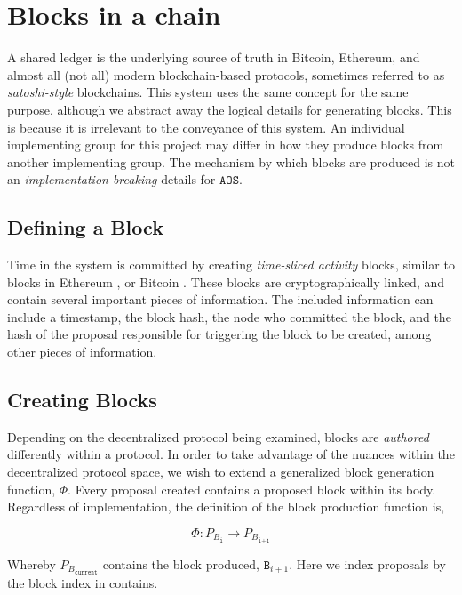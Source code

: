 \documentclass[10pt, titlepage, twocolumn]{report}
\begin{document}
\section{Blocks in a chain}
\hspace*{15pt}
A shared ledger is the underlying source of truth in Bitcoin, Ethereum, and almost all (not all) modern blockchain-based protocols, sometimes referred to as \textit{satoshi-style} blockchains. This system uses the same concept for the same purpose, although we abstract away the logical details for generating blocks. This is because it is irrelevant to the conveyance of this system. An individual implementing group for this project may differ in how they produce blocks from another implementing group. The mechanism by which blocks are produced is not an \textit{implementation-breaking} details for \(\texttt{AOS}\). 

\subsection{Defining a Block}
\hspace*{15pt}
Time in the system is committed by creating \textit{time-sliced activity} blocks, similar to blocks in Ethereum \cite{ETH}, or Bitcoin \cite{BTC}. These blocks are cryptographically linked, and contain several important pieces of information. The included information can include a timestamp, the block hash, the node who committed the block, and the hash of the proposal responsible for triggering the block to be created, among other pieces of information.


\subsection{Creating Blocks}
\hspace*{15pt}
Depending on the decentralized protocol being examined, blocks are \textit{authored} differently within a protocol. In order to take advantage of the nuances within the decentralized protocol space, we wish to extend a generalized block generation function, \(\Phi\). Every proposal created contains a proposed block within its body. Regardless of implementation, the definition of the block production function is,

\begin{equation}
\Phi : P_{B_{\texttt{i}}} \rightarrow P_{B_{\texttt{i+1}}}
\end{equation}

Whereby \(P_{B_{\texttt{current}}}\) contains the block produced, \(\texttt{B}_{i+1}\). Here we index proposals by the block index in contains.
\end{document}
